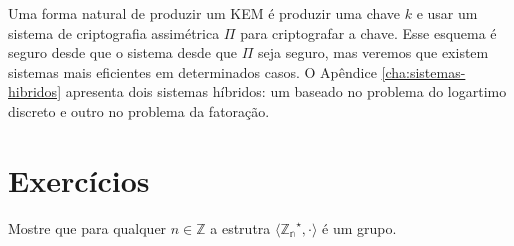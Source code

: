 Uma forma natural de produzir um KEM é produzir uma chave $k$ e usar um sistema de criptografia assimétrica $\Pi$ para criptografar a chave.
Esse esquema é seguro desde que o sistema desde que $\Pi$ seja seguro, mas veremos que existem sistemas mais eficientes em determinados casos.
O Apêndice \ref{cha:sistemas-hibridos} apresenta dois sistemas híbridos: um baseado no problema do logartimo discreto e outro no problema da fatoração.



\section{Exercícios}
\label{sec:exercicios}


\begin{exercicio}
  \label{ex:euler}
  Mostre que para qualquer $n \in \mathbb{Z}$ a estrutra $\langle \mathbb{Z_n}^\star, \cdot \rangle$ é um grupo.
\end{exercicio}



